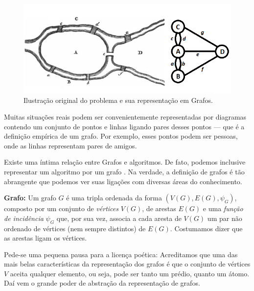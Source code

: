 \documentclass[a4paper,12pt]{article}
\begin{document}
	\begin{figure}[H]
		\begin{center}
			\includegraphics[width=0.85\linewidth]{koenigsbern.png}
		\end{center}
		\caption{Ilustração original do problema \cite{euler:KOENIGSBERG} e sua representação em Grafos.}
		\label{fig:koni}
	\end{figure}
	
	Muitas situações reais podem ser convenientemente representadas por diagramas contendo um conjunto de pontos e linhas ligando pares desses pontos --- que é a definição empírica de um grafo. Por exemplo, esses pontos podem ser pessoas, onde as linhas representam pares de amigos. 
	
	Existe uma íntima relação entre Grafos e algoritmos. De fato, podemos inclusive representar um algoritmo por um grafo \cite{grafos0}. Na verdade, a definição de grafos é tão abrangente que podemos ver suas ligações com diversas áreas do conhecimento.
		
	\begin{center}
		\begin{minipage}{0.9 \linewidth}
			\textbf{Grafo:} Um grafo $G$ é uma tripla ordenada da forma $(V(G),E(G), \psi_{G})$, composto por um conjunto de \textit{vértices} $V(G)$, de arestas $E(G)$ e uma \textit{função de incidência} $\psi_{G}$ que, por sua vez, associa a cada aresta de $V(G)$ um par não ordenado de vértices (nem sempre distintos) de $E(G)$. Costumamos dizer que as arestas ligam os vértices.
			
		\end{minipage}
	\end{center}
	
	Pede-se uma pequena pausa para a licença poética: Acreditamos que uma das mais belas características da representação dos grafos é que o conjunto de vértices $V$ aceita qualquer elemento, ou seja, pode ser tanto um prédio, quanto um átomo. Daí vem o grande poder de abstração da representação de grafos. 
	
\end{document}
